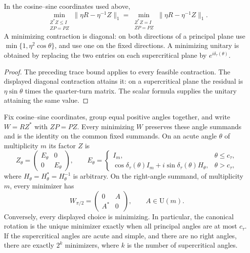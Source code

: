 \begin{corollary}
\label{cor:smoothed-exact-relaxation}
In the cosine--sine coordinates used above,
\[
 \min_{\substack{Z^*Z\leq I\\ZP=PZ}}\|\eta R-\eta^{-1}Z\|_1
 =\min_{\substack{Z^*Z=I\\ZP=PZ}}\|\eta R-\eta^{-1}Z\|_1.
\]
A minimizing contraction is diagonal: on both directions of a principal
plane use $\min\{1,\eta^2\cos\theta\}$, and use one on the fixed
directions. A minimizing unitary is obtained by replacing the two entries
on each supercritical plane by $e^{i\delta_\tau(\theta)}$.
\end{corollary}

\begin{proof}
The preceding trace bound applies to every feasible contraction. The
displayed diagonal contraction attains it: on a supercritical plane
the residual is $\eta\sin\theta$ times the quarter-turn matrix.
The scalar formula supplies the unitary attaining the same value.
\end{proof}

\begin{theorem}
\label{thm:smoothed-all-minimizers}
Fix cosine--sine coordinates, group equal positive angles together, and
write $W=RZ^*$ with $ZP=PZ$. Every minimizing $W$ preserves these angle
summands and is the identity on the common fixed summands. On an acute
angle $\theta$ of multiplicity $m$ its factor $Z$ is
\[
 Z_\theta=\begin{pmatrix}E_\theta&0\\0&E_\theta\end{pmatrix},
 \qquad
 E_\theta=
 \begin{cases}
  I_m,&\theta\leq c_\tau,\\
  \cos\delta_\tau(\theta)I_m+
    i\sin\delta_\tau(\theta)H_\theta,&\theta>c_\tau,
 \end{cases}
\]
where $H_\theta=H_\theta^*=H_\theta^{-1}$ is arbitrary.
On the right-angle summand, of multiplicity $m$, every minimizer has
\[
 W_{\pi/2}=\begin{pmatrix}0&A\\A^*&0\end{pmatrix},
 \qquad A\in\mathrm U(m).
\]
Conversely, every displayed choice is minimizing. In particular, the
canonical rotation is the unique minimizer exactly when all principal
angles are at most $c_\tau$. If the supercritical angles are acute and
simple, and there are no right angles, there are exactly $2^k$ minimizers,
where $k$ is the number of supercritical angles.
\end{theorem}

